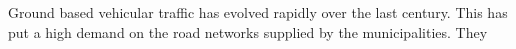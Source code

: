 Ground based vehicular traffic has evolved rapidly over the last century. This has put a high demand on the road networks supplied by the municipalities. They 